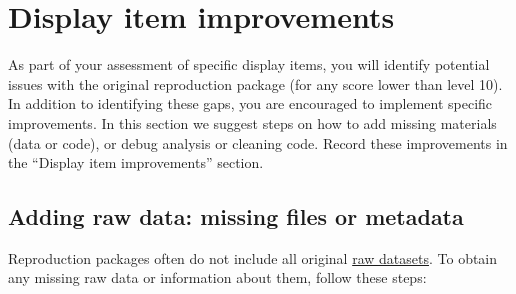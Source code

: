 \documentclass[
]{book}
\begin{document}
\hypertarget{di-imp}{%
\section{Display item improvements}\label{di-imp}}

As part of your assessment of specific display items, you will identify potential issues with the original reproduction package (for any score lower than level 10). In addition to identifying these gaps, you are encouraged to implement specific improvements. In this section we suggest steps on how to add missing materials (data or code), or debug analysis or cleaning code. Record these improvements in the ``Display item improvements'' section.

\hypertarget{rd}{%
\subsection{Adding raw data: missing files or metadata}\label{rd}}

Reproduction packages often do not include all original \protect\hyperlink{describe-inputs}{raw datasets}. To obtain any missing raw data or information about them, follow these steps:
\end{document}
